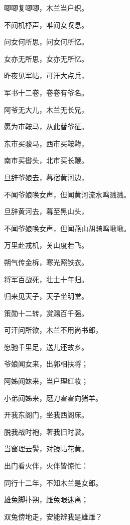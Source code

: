 \documentclass[12pt,UTF-8,openany,fontset=none]{ctexbook}
\begin{document}
\begin{center}
    \begin{Large}

        唧唧复唧唧，木兰当户织。

        不闻机杼声，唯闻女叹息。

        问女何所思，问女何所忆。

        女亦无所思，女亦无所忆。

        昨夜见军帖，可汗大点兵，

        军书十二卷，卷卷有爷名。

        阿爷无大儿，木兰无长兄，

        愿为市鞍马，从此替爷征。

        东市买骏马，西市买鞍鞯，

        南市买辔头，北市买长鞭。

        旦辞爷娘去，暮宿黄河边，

        \hspace{36pt}不闻爷娘唤女声，但闻黄河流水鸣溅溅。

        旦辞黄河去，暮至黑山头，

        \hspace{36pt}不闻爷娘唤女声，但闻燕山胡骑鸣啾啾。

        万里赴戎机，关山度若飞。

        朔气传金柝，寒光照铁衣。

        将军百战死，壮士十年归。

        归来见天子，天子坐明堂。

        策勋十二转，赏赐百千强。

        \hspace{34pt}可汗问所欲，木兰不用尚书郎，

        愿驰千里足，送儿还故乡。

        爷娘闻女来，出郭相扶将；

        阿姊闻妹来，当户理红妆；

        \hspace{34pt}小弟闻姊来，磨刀霍霍向猪羊。

        开我东阁门，坐我西阁床。

        脱我战时袍，著我旧时裳。

        当窗理云鬓，对镜帖花黄。

        出门看火伴，火伴皆惊忙：

        \hspace{34pt}同行十二年，不知木兰是女郎。

        雄兔脚扑朔，雌兔眼迷离；

        \hspace{36pt}双兔傍地走，安能辨我是雄雌？

    \end{Large}

\end{center}
\end{document}
